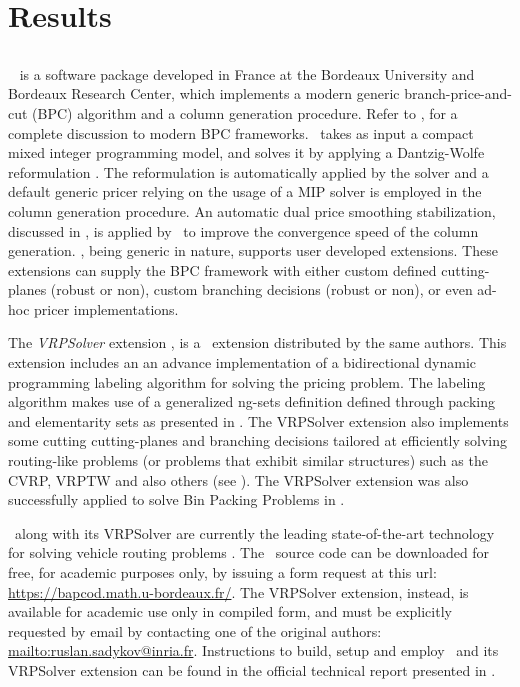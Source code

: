 \chapter{Results}
\label{sec:results}

\section{\bapcod}
\label{sec:results-bapcod}

\textit{\bapcod}\ \parencite{sadykov2021} is a software package
developed in France at the Bordeaux University and Bordeaux Research Center,
which implements a modern generic branch-price-and-cut (BPC) algorithm
and a column generation procedure.
Refer to \textcite{sadykov2019b}, for a complete discussion to modern BPC frameworks.
\bapcod\ takes as input a compact mixed integer programming model,
and solves it by applying a Dantzig-Wolfe reformulation \parencite{dantzig1960}.
The reformulation is automatically applied by the solver
and a default generic pricer relying on
the usage of a MIP solver is employed in the column generation procedure.
An automatic dual price smoothing stabilization, discussed in \textcite{pessoa2018automation},
is applied by \bapcod\ to improve the convergence speed of the column generation.
\bapcod, being generic in nature,
supports user developed extensions.
These extensions can supply the BPC framework with either
custom defined cutting-planes (robust or non), custom branching decisions (robust or non),
or even ad-hoc pricer implementations.

The \textit{VRPSolver} extension \parencite{pessoa2020a}, is
a \bapcod\ extension distributed by the same authors.
This extension includes an
an advance implementation of a bidirectional dynamic programming labeling algorithm
\parencite{sadykov2021a} for solving the pricing problem.
The labeling algorithm makes use of a generalized ng-sets definition \parencite{baldacci2011}
defined through packing and elementarity sets as presented in \textcite{pessoa2020a}.
The VRPSolver extension also implements
some cutting cutting-planes and branching decisions
tailored at efficiently solving routing-like problems
(or problems that exhibit similar structures)
such as the CVRP, VRPTW and also others (see \cite{pessoa2020a}).
The VRPSolver extension was also successfully applied
to solve Bin Packing Problems in \textcite{pessoa2020}.

\bapcod\ along with its VRPSolver are currently the leading state-of-the-art
technology for solving vehicle routing problems \parencite{pessoa2020a}.
The \bapcod\ source code can be downloaded for free, for academic purposes only,
by issuing a form request at this url: \url{https://bapcod.math.u-bordeaux.fr/}.
The VRPSolver extension, instead, is available for academic use only in compiled form,
and must be explicitly requested by email by contacting one of the
original authors: \url{mailto:ruslan.sadykov@inria.fr}.
Instructions to build, setup and employ \bapcod\ and its VRPSolver extension
can be found in the official technical report presented in \textcite{sadykov2021}.


